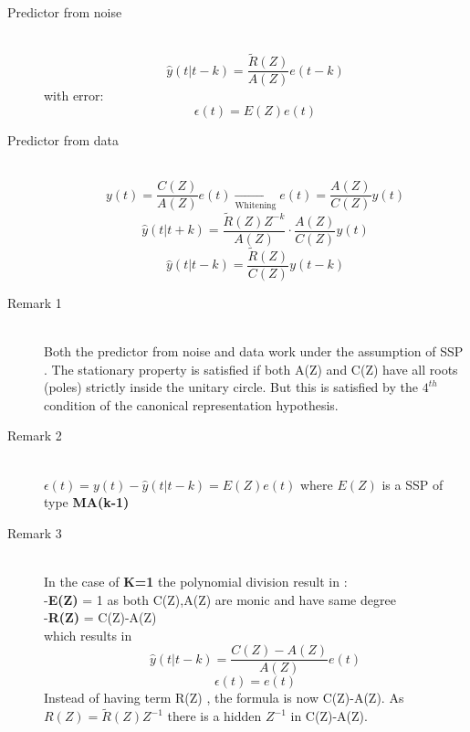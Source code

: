 \begin{description}
\item[Predictor from noise]\hfill\\
\[
\boxed{\hat{y}(t|t-k) = \frac{\tilde{R}(Z)}{A(Z)}e(t-k)}
\]
with error:
\[
\boxed{\epsilon(t) = E(Z)e(t)}
\]
\item[Predictor from data]\hfill\\
$$ y(t) =\frac{C(Z)}{A(Z)}e(t) \xrightarrow[\text{Whitening}]{}e(t) = \frac{A(Z)}{C(Z)}y(t)$$
$$ \hat{y}(t|t+k) = \frac{\tilde{R}(Z)Z^{-k}}{A(Z)} \cdot \frac{A(Z)}{C(Z)}y(t)$$
\[
\boxed{\hat{y}(t|t-k) = \frac{\tilde{R}(Z)}{C(Z)}y(t-k)}
\]
\item[Remark 1]\hfill\\
Both the predictor from noise and data work under the assumption of SSP . The stationary property is satisfied if both A(Z) and C(Z) have all roots (poles) strictly inside the unitary circle. But this is satisfied by the $4^{th}$ condition of the canonical representation hypothesis.
\item[Remark 2]\hfill\\
$\epsilon(t) = y(t)- \hat{y}(t|t-k)=E(Z)e(t)$ where $E(Z)$ is a SSP of type \textbf{MA(k-1)}
\item[Remark 3]\hfill\\
In the case of \textbf{K=1} the polynomial division result in :\\
-\textbf{E(Z)} = 1 as both C(Z),A(Z) are monic and have same degree\\
-\textbf{R(Z)} = C(Z)-A(Z)\\
which results in 
\[
\boxed{\hat{y}(t|t-k)=\frac{C(Z)-A(Z)}{A(Z)}e(t)}
\]
\[
\boxed{\epsilon(t)=e(t)}
\]
Instead of having term R(Z) , the formula is now C(Z)-A(Z). As $R(Z)= \tilde{R}(Z)Z^{-1}$ there is a hidden $Z^{-1}$ in C(Z)-A(Z).
\end{description}



